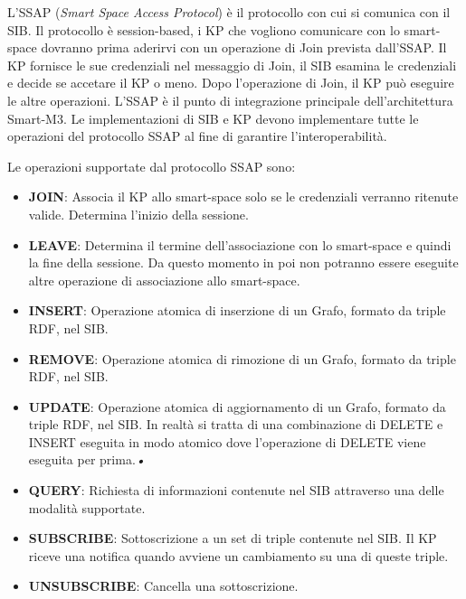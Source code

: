 L'SSAP (\emph{Smart Space Access Protocol}) è il protocollo con cui si comunica con il SIB. Il protocollo è session-based, i KP che vogliono comunicare con lo smart-space dovranno prima aderirvi con un operazione di Join prevista dall'SSAP. Il KP fornisce le sue credenziali nel messaggio di Join, il SIB esamina le credenziali e decide se accetare il KP o meno. Dopo l'operazione di Join, il KP può eseguire le altre operazioni. 
L'SSAP è il punto di integrazione principale dell'architettura Smart-M3. Le implementazioni di SIB e KP devono implementare tutte le operazioni del protocollo SSAP al fine di garantire l'interoperabilità.

Le operazioni supportate dal protocollo SSAP sono:

\begin{itemize}
	\item \textbf{JOIN}: Associa il KP allo smart-space solo se le credenziali verranno ritenute valide. Determina l'inizio della sessione.
	\item \textbf{LEAVE}: Determina il termine dell'associazione con lo smart-space e quindi la fine della sessione. Da questo momento in poi non potranno essere eseguite altre operazione di associazione allo smart-space.
	\item \textbf{INSERT}: Operazione atomica di inserzione di un Grafo, formato da triple RDF, nel SIB.
	\item \textbf{REMOVE}: Operazione atomica di rimozione di un Grafo, formato da triple RDF, nel SIB.
	\item \textbf{UPDATE}: Operazione atomica di aggiornamento di un Grafo, formato da triple RDF, nel SIB. In realtà si tratta di una combinazione di DELETE e INSERT eseguita in modo atomico dove l'operazione di DELETE viene eseguita per prima.\textsl{•}
	\item \textbf{QUERY}: Richiesta di informazioni contenute nel SIB attraverso una delle modalità supportate.
	\item \textbf{SUBSCRIBE}: Sottoscrizione a un set di triple contenute nel SIB. Il KP riceve una notifica quando avviene un cambiamento su una di queste triple.
	\item \textbf{UNSUBSCRIBE}: Cancella una sottoscrizione.
\end{itemize}


